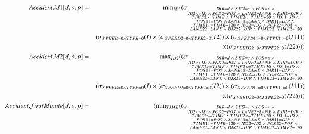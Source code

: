 \begin{eqnarray*}
Accident.id1[d, s, p] &=& \algmin_{ID} (
(\sigma_{ \substack{DIR = d \;\wedge\; SEG = s \;\wedge\; POS = p \;\wedge\; \\ID2 <> ID \;\wedge\; POS2 = POS \;\wedge\; LANE2 = LANE \;\wedge\; DIR2 = DIR \;\wedge\; \\ TIME2 >= TIME \;\wedge\; TIME2 <= TIME + 30 \;\wedge\; ID11 = ID \;\wedge\;\\ POS11 = POS \;\wedge\;  LANE11 = LANE \;\wedge\; DIR11=DIR \;\wedge\; \\TIME11 = TIME + 120 \;\wedge\; ID22 = ID2 \;\wedge\; POS22 = POS \;\wedge\; \\ LANE22 = LANE \;\wedge\; DIR22 = DIR \;\wedge\; TIME22 = TIME2 + 120}} \\
&& (\sigma_{SPEED = 0 \wedge TYPE = 0} (I) \times (\sigma_{SPEED2 = 0 \wedge TYPE2 = 0} (I2)) \times (\sigma_{SPEED11 = 0 \wedge TYPE11 = 0} (I11)) \\
&&\times (\sigma_{SPEED22 = 0 \wedge TYPE22 = 0} (I22)) ) )\\
%
Accident.id2[d, s, p] &=& \algmax_{ID2} (
(\sigma_{ \substack{DIR = d \;\wedge\; SEG = s \;\wedge\; POS = p \;\wedge\; \\ID2 <> ID \;\wedge\; POS2 = POS \;\wedge\; LANE2 = LANE \;\wedge\; DIR2 = DIR \;\wedge\; \\ TIME2 >= TIME \;\wedge\; TIME2 <= TIME + 30 \;\wedge\; ID11 = ID \;\wedge\;\\ POS11 = POS \;\wedge\;  LANE11 = LANE \;\wedge\; DIR11=DIR \;\wedge\; \\TIME11 = TIME + 120 \;\wedge\; ID22 = ID2 \;\wedge\; POS22 = POS \;\wedge\; \\ LANE22 = LANE \;\wedge\; DIR22 = DIR \;\wedge\; TIME22 = TIME2 + 120}} \\
&& (\sigma_{SPEED = 0 \wedge TYPE = 0} (I) \times (\sigma_{SPEED2 = 0 \wedge TYPE2 = 0} (I2)) \times (\sigma_{SPEED11 = 0 \wedge TYPE11 = 0} (I11)) \\
&&\times (\sigma_{SPEED22 = 0 \wedge TYPE22 = 0} (I22)) ) )\\
%
Accident.firstMinute[d, s, p] &=& (\algmin_{TIME} (
(\sigma_{ \substack{DIR = d \;\wedge\; SEG = s \;\wedge\; POS = p \;\wedge\; \\ID2 <> ID \;\wedge\; POS2 = POS \;\wedge\; LANE2 = LANE \;\wedge\; DIR2 = DIR \;\wedge\; \\ TIME2 >= TIME \;\wedge\; TIME2 <= TIME + 30 \;\wedge\; ID11 = ID \;\wedge\;\\ POS11 = POS \;\wedge\;  LANE11 = LANE \;\wedge\; DIR11=DIR \;\wedge\; \\TIME11 = TIME + 120 \;\wedge\; ID22 = ID2 \;\wedge\; POS22 = POS \;\wedge\; \\ LANE22 = LANE \;\wedge\; DIR22 = DIR \;\wedge\; TIME22 = TIME2 + 120}} \\

\end{eqnarray*}
